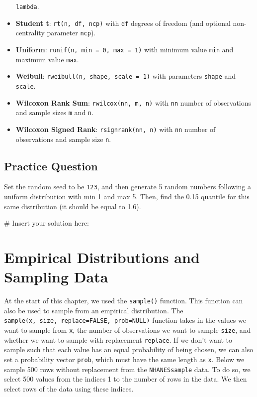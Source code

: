 \documentclass[
  letterpaper,
]{krantz}
\makeatletter
\newenvironment{Shaded}{\begin{snugshade}}{\end{snugshade}}
\newcommand{\CommentTok}[1]{\textcolor[rgb]{0.37,0.37,0.37}{#1}}
\newenvironment{kframe}{%
\medskip{}
\setlength{\fboxsep}{.8em}
 \def\at@end@of@kframe{}%
 \ifinner\ifhmode%
  \def\at@end@of@kframe{\end{minipage}}%
  \begin{minipage}{\columnwidth}%
 \fi\fi%
 \def\FrameCommand##1{\hskip\@totalleftmargin \hskip-\fboxsep
 \colorbox{shadecolor}{##1}\hskip-\fboxsep
     \hskip-\linewidth \hskip-\@totalleftmargin \hskip\columnwidth}%
 \MakeFramed {\advance\hsize-\width
   \@totalleftmargin\z@ \linewidth\hsize
   \@setminipage}}%
 {\par\unskip\endMakeFramed%
 \at@end@of@kframe}
\renewenvironment{Shaded}{\begin{kframe}}{\end{kframe}}
\makeatother
\begin{document}
\begin{itemize}
  \texttt{lambda}.
\item
  \textbf{Student t}: \texttt{rt(n,\ df,\ ncp)} with \texttt{df} degrees
  of freedom (and optional non-centrality parameter \texttt{ncp}).
\item
  \textbf{Uniform}: \texttt{runif(n,\ min\ =\ 0,\ max\ =\ 1)} with
  minimum value \texttt{min} and maximum value \texttt{max}.
\item
  \textbf{Weibull}: \texttt{rweibull(n,\ shape,\ scale\ =\ 1)} with
  parameters \texttt{shape} and \texttt{scale}.
\item
  \textbf{Wilcoxon Rank Sum}: \texttt{rwilcox(nn,\ m,\ n)} with
  \texttt{nn} number of observations and sample sizes \texttt{m} and
  \texttt{n}.
\item
  \textbf{Wilcoxon Signed Rank}: \texttt{rsignrank(nn,\ n)} with
  \texttt{nn} number of observations and sample size \texttt{n}.
\end{itemize}

\hypertarget{practice-question-15}{%
\subsection{Practice Question}\label{practice-question-15}}

Set the random seed to be \texttt{123}, and then generate 5 random
numbers following a uniform distribution with min 1 and max 5. Then,
find the 0.15 quantile for this same distribution (it should be equal to
1.6).

\begin{Shaded}
\begin{Highlighting}[]
\CommentTok{\# Insert your solution here:}
\end{Highlighting}
\end{Shaded}

\hypertarget{empirical-distributions-and-sampling-data}{%
\section{Empirical Distributions and Sampling
Data}\label{empirical-distributions-and-sampling-data}}

At the start of this chapter, we used the \texttt{sample()} function.
This function can also be used to sample from an empirical distribution.
The \texttt{sample(x,\ size,\ replace=FALSE,\ prob=NULL)} function takes
in the values we want to sample from \texttt{x}, the number of
observations we want to sample \texttt{size}, and whether we want to
sample with replacement \texttt{replace}. If we don't want to sample
such that each value has an equal probability of being chosen, we can
also set a probability vector \texttt{prob}, which must have the same
length as \texttt{x}. Below we sample 500 rows without replacement from
the \texttt{NHANESsample} data. To do so, we select 500 values from the
indices 1 to the number of rows in the data. We then select rows of the
data using these indices.
\end{document}
